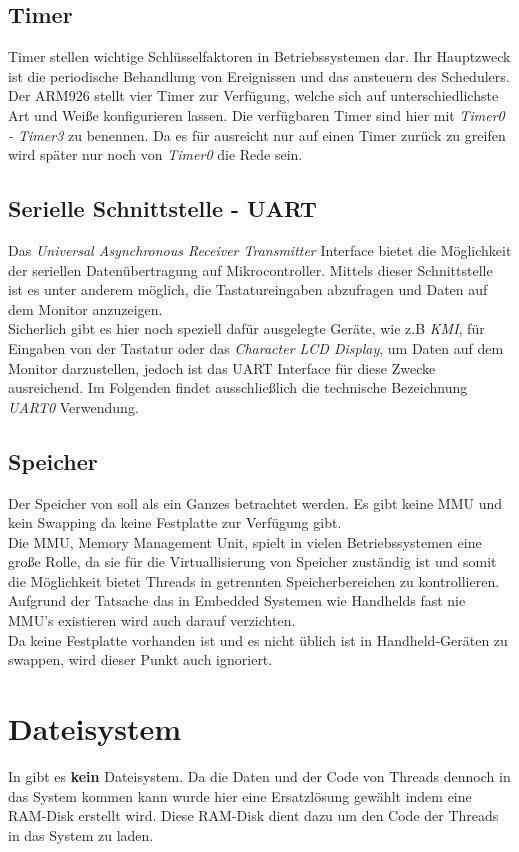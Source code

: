 \subsection{Timer}
Timer stellen wichtige Schl\"usselfaktoren in Betriebssystemen dar. Ihr Hauptzweck ist die periodische Behandlung von Ereignissen und das ansteuern des Schedulers. \\
Der ARM926 stellt vier Timer zur Verf\"ugung, welche sich auf unterschiedlichste Art und Wei\ss e konfigurieren lassen. Die verf\"ugbaren Timer sind hier mit \textit{Timer0 - Timer3} zu benennen\parencite[vgl.][262]{archManI}. Da es f\"ur \mops ausreicht nur auf einen Timer zur\"uck zu greifen wird sp\"ater nur noch von \textit{Timer0} die Rede sein.
\subsection{Serielle Schnittstelle - UART}
Das \textit{Universal Asynchronous Receiver Transmitter} Interface bietet die M\"oglichkeit der seriellen Daten\"ubertragung auf Mikrocontroller. Mittels dieser Schnittstelle ist es unter anderem m\"oglich, die Tastatureingaben abzufragen und Daten auf dem Monitor anzuzeigen. \\
Sicherlich gibt es hier noch speziell daf\"ur ausgelegte Ger\"ate, wie z.B \textit{KMI}, f\"ur Eingaben von der Tastatur oder das \textit{Character LCD Display}, um Daten auf dem Monitor darzustellen,  jedoch ist das UART Interface f\"ur diese Zwecke ausreichend. Im Folgenden findet ausschlie\ss lich die technische Bezeichnung \textit{UART0} Verwendung.
\subsection{Speicher}
Der Speicher von \mops soll als ein Ganzes betrachtet werden. Es gibt keine MMU und kein Swapping da keine Festplatte zur Verf\"ugung gibt.\\
Die MMU, Memory Management Unit, spielt in vielen Betriebssystemen eine gro\ss e Rolle, da sie f\"ur die Virtuallisierung von Speicher zust\"andig ist und somit die M\"oglichkeit bietet Threads in getrennten Speicherbereichen zu kontrollieren. Aufgrund der Tatsache das in Embedded Systemen wie Handhelds fast nie MMU's existieren wird auch \mops darauf verzichten.\\
Da keine Festplatte vorhanden ist und es nicht \"ublich ist in Handheld-Ger\"aten zu swappen, wird dieser Punkt auch ignoriert.

\section{Dateisystem}
In \mops gibt es \textbf{kein} Dateisystem. Da die Daten und der Code von Threads dennoch in das System kommen kann wurde hier eine Ersatzl\"osung gew\"ahlt indem eine RAM-Disk erstellt wird. Diese RAM-Disk dient dazu um den Code der Threads in das System zu laden.

